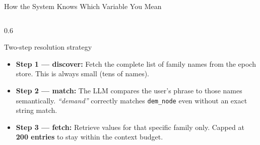 \documentclass[aspectratio=169,10pt]{beamer}
\begin{document}
\begin{frame}[t]{How the System Knows Which Variable You Mean}
\begin{columns}[T]
\begin{column}{0.6\textwidth}
\begin{block}{Two-step resolution strategy}
\begin{itemize}
        \item \textbf{Step 1 — discover:} Fetch the complete list
              of family names from the epoch store.
              This is always small (tens of names).
        \item \textbf{Step 2 — match:} The LLM compares the user's
              phrase to those names semantically.
              \emph{``demand''} correctly matches
              \texttt{dem\_node} even without an exact string match.
        \item \textbf{Step 3 — fetch:} Retrieve values for that
              specific family only.
              Capped at \textbf{200 entries} to stay within
              the context budget.
      \end{itemize}
    \end{block}
  \end{column}
\end{columns}
\end{frame}
\end{document}
